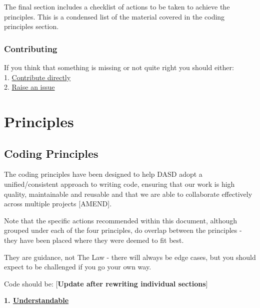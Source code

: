 \documentclass[]{book}
\begin{document}
The final section includes a checklist of actions to be taken to achieve the principles. This is a condensed list of the material covered in the coding principles section.

\hypertarget{contributing}{%
\section{Contributing}\label{contributing}}

If you think that something is missing or not quite right you should either:\\
1. \protect\hyperlink{versioncontrol}{Contribute directly}\\
2. \href{https://github.com/moj-analytical-services/our-coding-standards/issues}{Raise an issue}

\hypertarget{part-principles}{%
\part{Principles}\label{part-principles}}

\hypertarget{principles}{%
\chapter*{Coding Principles}\label{principles}}

The coding principles have been designed to help DASD adopt a unified/consistent approach to writing code, ensuring that our work is high quality, maintainable and reusable and that we are able to collaborate effectively across multiple projects {[}AMEND{]}.

Note that the specific actions recommended within this document, although grouped under each of the four principles, do overlap between the principles - they have been placed where they were deemed to fit best.

They are guidance, not The Law - there will always be edge cases, but you should expect to be challenged if you go your own way.

Code should be:
{[}\textbf{Update after rewriting individual sections}{]}

\textbf{1. \protect\hyperlink{understand}{Understandable}}
\end{document}
